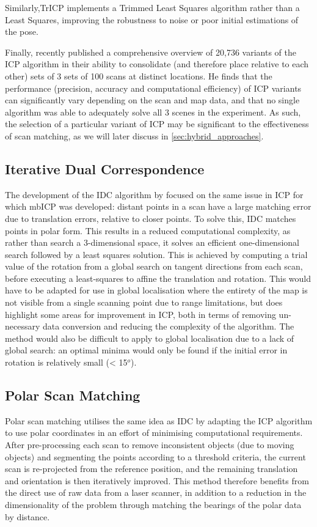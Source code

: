 \documentclass[authoryearcitations]{UoYCSproject}
\begin{document}
Similarly,TrICP \cite{Chetverikov2005-yz} implements a Trimmed Least Squares \cite{Ruppert1980-js} algorithm rather than a Least Squares, improving the robustness to noise or poor initial estimations of the pose.

Finally, \citet{Donoso2017-wp} recently published a comprehensive  overview of 20,736 variants of the ICP algorithm in their ability to consolidate (and therefore place relative to each other) sets of 3 sets of 100 scans at distinct locations. He finds that the performance (precision, accuracy and computational efficiency) of ICP variants can significantly vary depending on the scan and map data, and that no single algorithm was able to adequately solve all 3 scenes in the experiment. As such, the selection of a particular variant of ICP may be significant to the effectiveness of scan matching, as we will later discuss in \ref{sec:hybrid_approaches}.


\subsection{Iterative Dual Correspondence}

The development of the IDC algorithm by \citet{Lu1997-zv} focused on the same issue in ICP for which mbICP was developed: distant points in a scan have a large matching error due to translation errors, relative to closer points. To solve this, IDC matches points in polar form. This results in a reduced computational complexity, as rather than search a 3-dimensional space, it solves an efficient one-dimensional search followed by a least squares solution. This is achieved by computing a trial value of the rotation from a global search on tangent directions from each scan, before executing a least-squares to affine the translation and rotation. This would have to be adapted for use in global localisation where the entirety of the map is not visible from a single scanning point due to range limitations, but does highlight some areas for improvement in ICP, both in terms of removing un-necessary data conversion and reducing the complexity of the algorithm. The method would also be difficult to apply to global localisation due to a lack of global search: an optimal minima would only be found if the initial error in rotation is relatively small (< 15$^o$).


\subsection{Polar Scan Matching}
\label{subsec:psm}
Polar scan matching \citet{Albert_Diosi2005-iw} utilises the same idea as IDC by adapting the ICP algorithm to use polar coordinates in an effort of minimising computational requirements. After pre-processing each scan to remove inconsistent objects (due to moving objects) and segmenting the points according to a threshold criteria, the current scan is re-projected from the reference position, and the remaining translation and orientation is then iteratively improved. This method therefore benefits from the direct use of raw data from a laser scanner, in addition to a reduction in the dimensionality of the problem through matching the bearings of the polar data by distance. 
\end{document}
